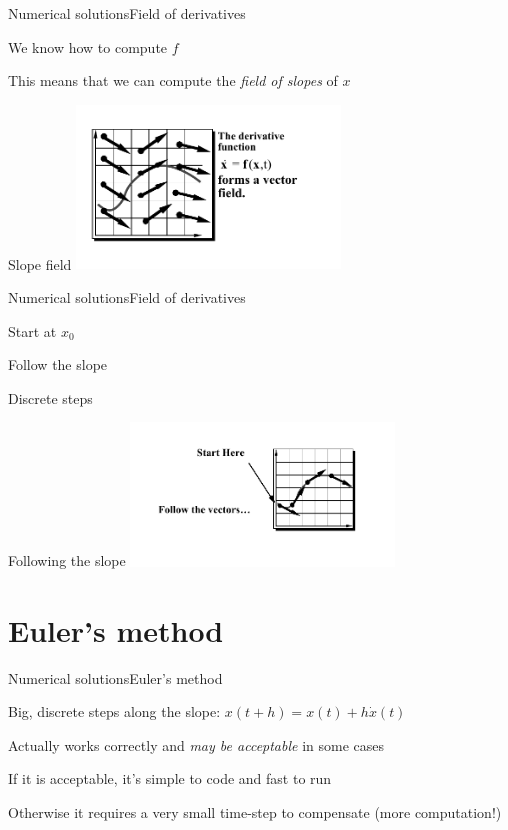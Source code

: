 \documentclass{beamer}
\begin{document}
\begin{slide}{Numerical solutions}{Field of derivatives}{
\item We know how to compute $f$
\item This means that we can compute the \textit{field of slopes} of $x$
}\end{slide}

\begin{frame}{Slope field}
\center
\includegraphics[width=7cm]{Pics/Fig1.png}
\end{frame}

\begin{slide}{Numerical solutions}{Field of derivatives}{
\item Start at $x_0$ 
\item Follow the slope
\item Discrete steps
}\end{slide}

\begin{frame}{Following the slope}
\center
\includegraphics[width=7cm]{Pics/Fig2.png}
\end{frame}

\section{Euler's method}
\begin{slide}{Numerical solutions}{Euler's method}{
\item Big, discrete steps along the slope: $x(t+h) = x(t) + h \dot x(t)$
\item Actually works correctly and \textit{may be acceptable} in some cases
\item If it is acceptable, it's simple to code and fast to run
\item Otherwise it requires a very small time-step to compensate (more computation!)
}\end{slide}
\end{document}
